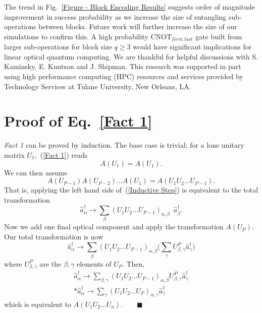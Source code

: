 \documentclass[aps,pra,twocolumn,showpacs,superscriptaddress,floatfix,10pt]{revtex4}
\begin{document}
 The trend in Fig.~\ref{Figure - Block Encoding Results} suggests order of magnitude improvement in success probability as we increase the size of entangling sub-operations between blocks. Future work will further increase the size of our simulations to confirm this. A high probability $\mbox{CNOT}_{first,last}$ gate built from larger sub-operations for block size $q \ge 3$ would have significant implications for linear optical quantum computing.
\acknowledgments
We are thankful for helpful discussions with S. Kaminsky, E. Knutson and J. Shipman. This research was supported in part using high performance computing (HPC) resources and services provided by Technology Services at Tulane University, New Orleans, LA.
\appendix
\section{Proof of Eq.~\ref{Fact 1}}
\label{Proof of Fact 1}
\textit{Fact 1} can be proved by induction. The base case is trivial; for a lone unitary matrix $U_1$,~(\ref{Fact 1}) reads
\begin{equation}
	A(U_1) = A(U_1).
\end{equation}
We can then assume
\begin{equation}
\label{Inductive Step}
	A(U_{P-1}) A(U_{P-2}) \dots A(U_1) = A(U_1 U_2 \dots U_{P-1}).
\end{equation}
That is, applying the left hand side of~(\ref{Inductive Step}) is equivalent to the total transformation
\begin{equation}
	\hat{a}^\dagger_\alpha \rightarrow \sum_\beta (U_1 U_2 \dots U_{P-1})_{\alpha,\beta} \enspace \hat{a}^\dagger_\beta.
\end{equation}
Now we add one final optical component and apply the transformation $A(U_P)$. Our total transformation is now
\begin{equation}
	\hat{a}^\dagger_\alpha \rightarrow \sum_\beta (U_1 U_2 \dots U_{P-1})_{\alpha,\beta} \Big(\sum_\gamma U_{\beta,\gamma}^P \hat{a}^\dagger_\gamma \Big)
\end{equation}
where $U_{\beta,\gamma}^P$ are the $\beta,\gamma$ elements of $U_P$. Then,
\begin{eqnarray}
\hat{a}^\dagger_\alpha \rightarrow \sum_{\beta,\gamma} (U_1 U_2 \dots U_{P-1})_{\alpha,\beta} U^P_{\beta,\gamma} \hat{a}^\dagger_\gamma
\\*
\hat{a}^\dagger_\alpha \rightarrow \sum_\gamma (U_1 U_2 \dots U_P)_{\alpha,\gamma} \hat{a}^\dagger_\gamma \quad
\end{eqnarray}
which is equivalent to $A(U_1 U_2 \dots U_n). \quad \quad\blacksquare $
\end{document}
